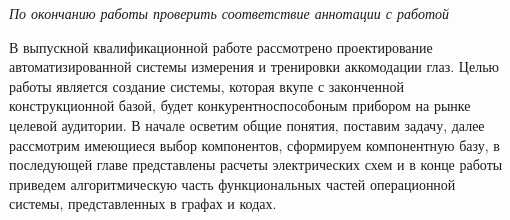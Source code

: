\textit{По окончанию работы проверить соответствие аннотации с работой}

В  выпускной  квалификационной  работе рассмотрено проектирование автоматизированной системы измерения и тренировки аккомодации глаз. Целью работы является создание системы, которая вкупе с законченной конструкционной базой, будет конкурентноспособоным прибором на рынке целевой аудитории. В начале осветим общие понятия, поставим задачу, далее рассмотрим имеющиеся выбор компонентов, сформируем компонентную базу, в последующей главе представлены расчеты электрических схем и в конце работы приведем алгоритмическую часть функциональных частей операционной системы, представленных в графах и кодах.


